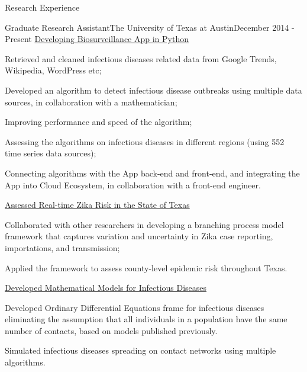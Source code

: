 \documentclass{my_resume} %
\begin{document}

\begin{rSection}{Research Experience}

\begin{rSubsection}{Graduate Research Assistant}{The
    University of Texas at Austin}{December 2014 - Present}
  \underline{Developing Biosurveillance App in Python}
  \item Retrieved and cleaned infectious diseases related data from Google
    Trends, Wikipedia, WordPress etc;
  \item Developed an algorithm to detect infectious disease outbreaks using
    multiple data sources, in collaboration with a mathematician;
  \item Improving performance and speed of the algorithm;
  \item Assessing the algorithms on infectious diseases in different regions
    (using 552 time series data sources);
  \item Connecting algorithms with the App back-end and front-end, and
    integrating the App into Cloud Ecosystem, in collaboration with a front-end
    engineer.

  \underline{Assessed Real-time Zika Risk in the State of Texas}
  \item Collaborated with other researchers in developing a branching process
    model framework that captures variation and uncertainty in Zika case
    reporting, importations, and transmission;
  \item Applied the framework to assess county-level epidemic risk throughout
    Texas.

  \underline{Developed Mathematical Models for Infectious Diseases}
  \item Developed Ordinary Differential Equations frame for infectious diseases
    eliminating the assumption that all individuals in a population have the
    same number of contacts, based on models published previously.
  \item Simulated infectious diseases spreading on contact networks using
    multiple algorithms.
\end{rSubsection}
\end{rSection}

\end{document}
